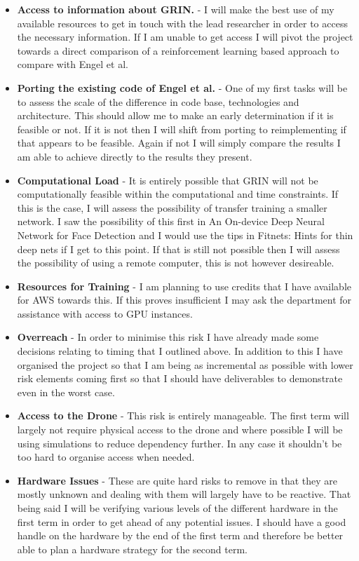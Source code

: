 \documentclass[]{../resources/final_report}
\begin{document}
\begin{itemize}
  \item \textbf{Access to information about GRIN.} - I will make the best use of my available resources to get in touch with the lead researcher in order to access the necessary information. If I am unable to get access I will pivot the project towards a direct comparison of a reinforcement learning based approach to compare with Engel et al.
  \item \textbf{Porting the existing code of Engel et al.} - One of my first tasks will be to assess the scale of the difference in code base, technologies and architecture. This should allow me to make an early determination if it is feasible or not. If it is not then I will shift from porting to reimplementing if that appears to be feasible. Again if not I will simply compare the results I am able to achieve directly to the results they present.
  \item \textbf{Computational Load} - It is entirely possible that GRIN will not be computationally feasible within the computational and time constraints. If this is the case, I will assess the possibility of transfer training a smaller network. I saw the possibility of this first in An On-device Deep Neural Network for Face Detection \cite{apple_machine_learning_journal_2017} and I would use the tips in Fitnets: Hints for thin deep nets \cite{Romero15fitnets:hints} if I get to this point. If that is still not possible then I will assess the possibility of using a remote computer, this is not however desireable.
  \item \textbf{Resources for Training} - I am planning  to use credits that I have available for AWS towards this. If this proves insufficient I may ask the department for assistance with access to GPU instances.
  \item \textbf{Overreach} - In order to minimise this risk I have already made some decisions relating to timing that I outlined above. In addition to this I have organised the project so that I am being as incremental as possible with lower risk elements coming first so that I should have deliverables to demonstrate even in the worst case. 
  \item \textbf{Access to the Drone} - This risk is entirely manageable. The first term will largely not require physical access to the drone and where possible I will be using simulations to reduce dependency further. In any case it shouldn't be too hard to organise access when needed.
  \item \textbf{Hardware Issues} - These are quite hard risks to remove in that they are mostly unknown and dealing with them will largely have to be reactive. That being said I will be verifying various levels of the different hardware in the first term in order to get ahead of any potential issues. I should have a good handle on the hardware by the end of the first term and therefore be better able to plan a hardware strategy for the second term.
\end{itemize}

%
\newpage



\label{endpage}
\end{document}

